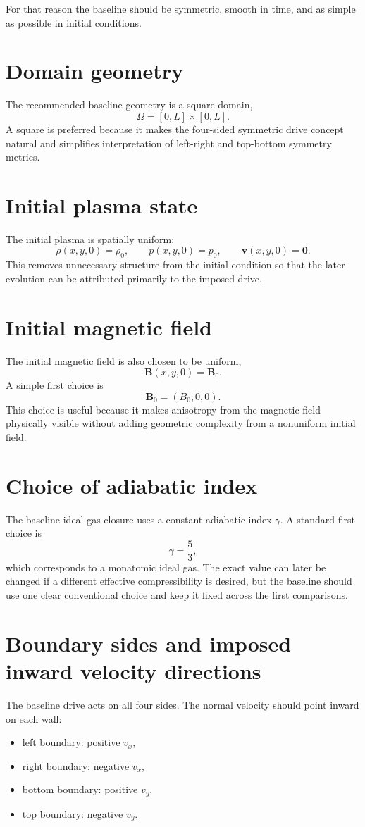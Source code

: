 \documentclass[11pt]{article}
\begin{document}
For that reason the baseline should be symmetric, smooth in time, and as simple as possible in initial conditions.

\section{Domain geometry}
The recommended baseline geometry is a square domain,
\[
\Omega = [0,L]\times[0,L].
\]
A square is preferred because it makes the four-sided symmetric drive concept natural and simplifies interpretation of left-right and top-bottom symmetry metrics.

\section{Initial plasma state}
The initial plasma is spatially uniform:
\[
\rho(x,y,0)=\rho_0, \qquad p(x,y,0)=p_0, \qquad \mathbf{v}(x,y,0)=\mathbf{0}.
\]
This removes unnecessary structure from the initial condition so that the later evolution can be attributed primarily to the imposed drive.

\section{Initial magnetic field}
The initial magnetic field is also chosen to be uniform,
\[
\mathbf{B}(x,y,0)=\mathbf{B}_0.
\]
A simple first choice is
\[
\mathbf{B}_0=(B_0,0,0).
\]
This choice is useful because it makes anisotropy from the magnetic field physically visible without adding geometric complexity from a nonuniform initial field.

\section{Choice of adiabatic index}
The baseline ideal-gas closure uses a constant adiabatic index $\gamma$. A standard first choice is
\[
\gamma = \frac{5}{3},
\]
which corresponds to a monatomic ideal gas. The exact value can later be changed if a different effective compressibility is desired, but the baseline should use one clear conventional choice and keep it fixed across the first comparisons.

\section{Boundary sides and imposed inward velocity directions}
The baseline drive acts on all four sides. The normal velocity should point inward on each wall:
\begin{itemize}
    \item left boundary: positive $v_x$,
    \item right boundary: negative $v_x$,
    \item bottom boundary: positive $v_y$,
    \item top boundary: negative $v_y$.
\end{itemize}
\end{document}
